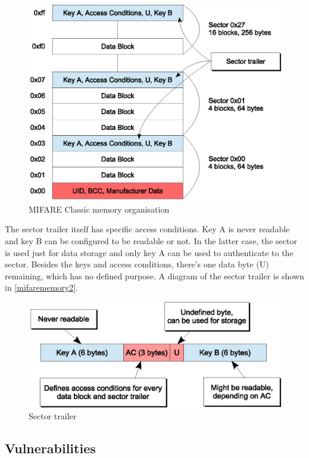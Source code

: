 \documentclass[12pt,a4paper,twoside,openright]{report}
\begin{document}
\begin{figure}[tbh]
\centerline{\includegraphics{figures/mifarememory1.eps}}
\caption{MIFARE Classic memory organisation}
\label{mifarememory1}
\end{figure}

The sector trailer itself has specific access conditions. Key A is never readable and key B can be configured to be readable or not. In the latter case, the sector is used just for data storage and only key A can be used to authenticate to the sector. Besides the keys and access conditions, there's one data byte (U) remaining, which has no defined purpose. A diagram of the sector trailer is shown in \autoref{mifarememory2}.

\begin{figure}[tbh]
\centerline{\includegraphics{figures/mifarememory2.eps}}
\caption{Sector trailer}
\label{mifarememory2}
\end{figure}

\subsection{Vulnerabilities}
\label{mifarevulnerabilities}
\end{document}
